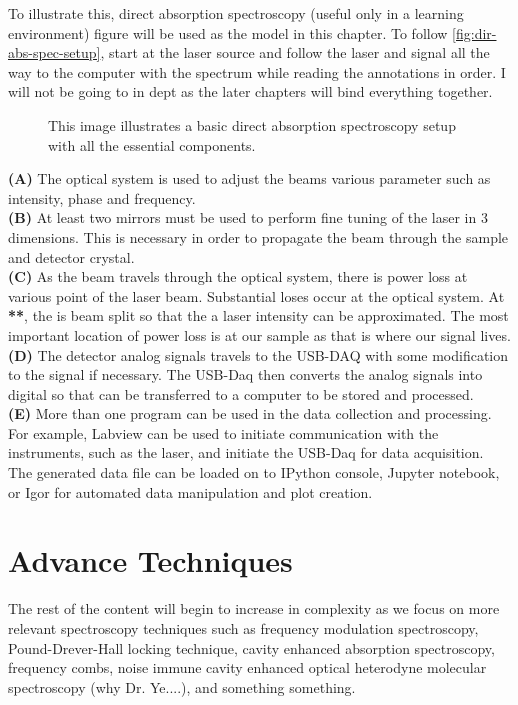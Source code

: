\documentclass[11pt,a4paper]{book}
\newcommand{\imginput}[1]{} %
\begin{document}
		To illustrate this, direct absorption spectroscopy (useful only in a learning environment) figure will be used as the model in this chapter. To follow \autoref{fig:dir-abs-spec-setup}, start at the laser source and follow the laser and signal all the way to the computer with the spectrum while reading the annotations in order. I will not be going to in dept as the later chapters will bind everything together.	
		
		\begin{figure} [!ht]
			\centering
			\def\svgwidth{\columnwidth}
			\resizebox{16cm}{!}{\imginput{images/dir-abs-spec-setup.pdf_tex}}
			\caption{This image illustrates a basic direct absorption spectroscopy setup with all the essential components.}
			\label{fig:dir-abs-spec-setup}
		\end{figure}	
		
		\noindent
		{\bfseries (A)} The optical system is used to adjust the beams various parameter such as intensity, phase and frequency.\\
		{\bfseries (B)} At least two mirrors must be used to perform fine tuning of the laser in 3 dimensions. This is necessary in order to propagate the beam through the sample and detector crystal. \\
		{\bfseries (C)} As the beam travels through the optical system, there is power loss at various point of the laser beam. Substantial loses occur at the optical system. At\\ {\bfseries ***}, the is beam split so that the a laser intensity can be approximated. The most important location of power loss is at our sample as that is where our signal lives.\\
		{\bfseries(D)} The detector analog signals travels to the USB-DAQ with some modification to the signal if necessary. The USB-Daq then converts the analog signals into digital so that can be transferred to a computer to be stored and processed. \\
		{\bfseries(E)} More than one program can be used in the data collection and processing. For example, Labview can be used to initiate communication with the instruments, such as the laser, and initiate the USB-Daq for data acquisition. The generated data file can be loaded on to IPython console, Jupyter notebook, or Igor for automated data manipulation and plot creation.		
	
	\section{Advance Techniques}
		\label{sec:Advance Techniques}
		The rest of the content will begin to increase in complexity as we focus on more relevant spectroscopy techniques such as frequency modulation spectroscopy, Pound-Drever-Hall locking technique, cavity enhanced absorption spectroscopy, frequency combs, noise immune cavity enhanced optical heterodyne molecular spectroscopy (why Dr. Ye....), and something something.
\end{document}
